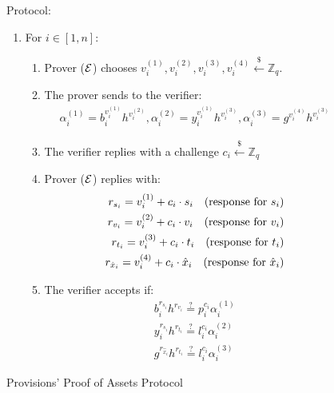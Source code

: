 \begin{figure}[h]
\begin{mdframed}
    Protocol:
    \begin{enumerate}
        \item For $i \in [1, n]$:
            \begin{enumerate}
                \item Prover ($\mathcal{E}$) chooses $v_i^{(1)}, v_i^{(2)}, v_i^{(3)}, v_i^{(4)} \xleftarrow{\$} \mathbb{Z}_q$.
                \item The prover sends to the verifier:
                    \begin{align}
                        \alpha_i^{(1)} = b_i^{v_i^{(1)}}h^{v_i^{(2)}}, \alpha_i^{(2)} = y_i^{v_i^{(1)}}h^{v_i^{(3)}}, \alpha_i^{(3)} = g^{v_i^{(4)}}h^{v_i^{(3)}} \nonumber
                    \end{align}
                \item The verifier replies with a challenge $c_i \xleftarrow{\$} \mathbb{Z}_q$
                \item Prover ($\mathcal{E}$) replies with:
                    \begin{align}
                        r_{s_i} = v_i^{(1)} + c_i \cdot s_i \text{\quad (response for $s_i$)} \nonumber \\
                        r_{v_i} = v_i^{(2)} + c_i \cdot v_i \text{\quad (response for $v_i$)} \nonumber \\
                        r_{t_i} = v_i^{(3)} + c_i \cdot t_i \text{\quad (response for $t_i$)} \nonumber \\
                        r_{\hat{x}_i} = v_i^{(4)} + c_i \cdot \hat{x}_i \text{\quad (response for $\hat{x}_i$)} \nonumber
                    \end{align}
                \item The verifier accepts if:
                    \begin{align}
                        b_i^{r_{s_i}}h^{r_{v_i}} \stackrel{?}{=} p_i^{c_i}\alpha_i^{(1)} \nonumber \\
                        y_i^{r_{s_i}}h^{r_{t_i}} \stackrel{?}{=} l_i^{c_i}\alpha_i^{(2)} \nonumber \\
                        g^{r_{\hat{x}_i}}h^{r_{t_i}} \stackrel{?}{=} l_i^{c_i}\alpha_i^{(3)} \nonumber
                    \end{align}
            \end{enumerate}
    \end{enumerate}

\end{mdframed}
\caption{Provisions' Proof of Assets Protocol}
\label{fig:provisions_assets_proto}
\end{figure}
